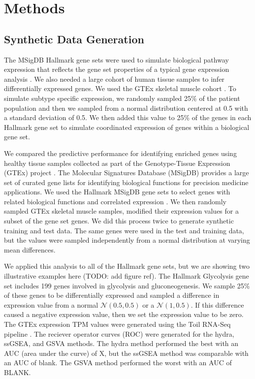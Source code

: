 \documentclass[fleqn,10pt]{wlscirep}
\begin{document}
\section*{Methods}


\subsection{Synthetic Data Generation}
The MSigDB Hallmark gene sets were used to simulate biological pathway expression that reflects the gene set properties of a typical gene expression analysis \cite{liberzon2015molecular,liberzon2011molecular}. We also needed a large cohort of human tissue samples to infer differentially expressed genes. We used the GTEx skeletal muscle cohort \cite{consortium2013genotype}. To simulate subtype specific expression, we randomly sampled 25\% of the patient population and then we sampled from a normal distribution centered at 0.5 with a standard deviation of 0.5. We then added this value to 25\% of the genes in each Hallmark gene set to simulate coordinated expression of genes within a biological gene set.

We compared the predictive performance for identifying enriched genes using healthy tissue samples collected as part of the Genotype-Tissue Expression (GTEx) project \cite{lonsdale2013genotype}. The Molecular Signatures Database (MSigDB) provides a large set of curated gene lists for identifying biological functions for precision medicine applications. We used the Hallmark MSigDB gene sets to select genes with related biological functions and correlated expression \cite{liberzon2015molecular}. We then randomly sampled GTEx skeletal muscle samples, modified their expression values for a subset of the gene set genes. We did this process twice to generate synthetic training and test data. The same genes were used in the test and training data, but the values were sampled independently from a normal distribution at varying mean differences. 

We applied this analysis to all of the Hallmark gene sets, but we are showing two illustrative examples here (TODO: add figure ref). The Hallmark Glycolysis gene set includes 199 genes involved in glycolysis and gluconeogenesis. We sample 25\% of these genes to be differentially expressed and sampled a difference in expression value from a normal $\mathcal{N}(0.5, 0.5)$ or a $\mathcal{N}(1, 0.5)$. If this difference caused a negative expression value, then we set the expression value to be zero. The GTEx expression TPM values were generated using the Toil RNA-Seq pipeline \cite{vivian2017toil}. The reciever operator curves (ROC) were generated for the hydra, ssGSEA, and GSVA methods. The hydra method performed the best with an AUC (area under the curve) of X, but the ssGSEA method was comparable with an AUC of blank. The GSVA method performed the worst with an AUC of BLANK.
\end{document}
